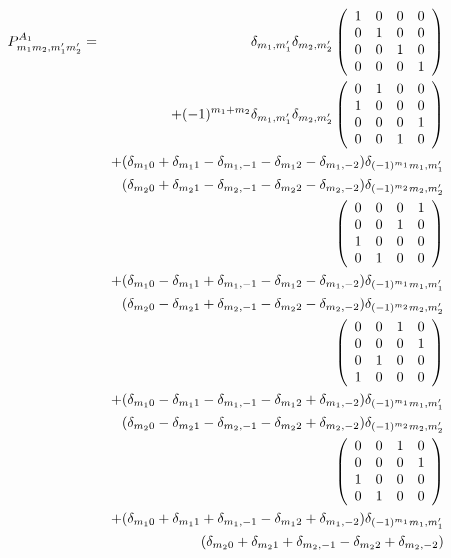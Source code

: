 \begin{eqnarray}\label{P}
P^{A_1}_{m_1m_2,m'_1m'_2}&=&\delta_{m_1,m'_1}\delta_{m_2,m'_2}
\left (
\begin{array}{cccc}
1 & 0 & 0 & 0 \\
0 & 1 & 0 & 0 \\
0 & 0 & 1 & 0 \\
0 & 0 & 0 & 1 
\end{array} \right )\nn
&&+(-1)^{m_1+m_2}\delta_{m_1,m'_1}\delta_{m_2,m'_2}
\left (
\begin{array}{cccc}
0 & 1 & 0 & 0 \\
1 & 0 & 0 & 0 \\
0 & 0 & 0 & 1 \\
0 & 0 & 1 & 0 
\end{array} \right )\nn
&&+(\delta_{m_10}+\delta_{m_11}-\delta_{m_1,-1}-\delta_{m_12}-\delta_{m_1,-2})
\delta_{(-1)^{m_1}m_1,m'_1} \nn
&&
(\delta_{m_20}+\delta_{m_21}-\delta_{m_2,-1}-\delta_{m_22}-\delta_{m_2,-2})
\delta_{(-1)^{m_2}m_2,m'_2} \nn
&&\left (
\begin{array}{cccc}
0 & 0 & 0 & 1 \\
0 & 0 & 1 & 0 \\
1 & 0 & 0 & 0 \\
0 & 1 & 0 & 0 
\end{array} \right ) \nn
&&+(\delta_{m_10}-\delta_{m_11}+\delta_{m_1,-1}-\delta_{m_12}-\delta_{m_1,-2})
\delta_{(-1)^{m_1}m_1,m'_1} \nn
&&
(\delta_{m_20}-\delta_{m_21}+\delta_{m_2,-1}-\delta_{m_22}-\delta_{m_2,-2})
\delta_{(-1)^{m_2}m_2,m'_2} \nn
&&\left (
\begin{array}{cccc}
0 & 0 & 1 & 0 \\
0 & 0 & 0 & 1 \\
0 & 1 & 0 & 0 \\
1 & 0 & 0 & 0 
\end{array} \right )\nn
&&+(\delta_{m_10}-\delta_{m_11}-\delta_{m_1,-1}-\delta_{m_12}+\delta_{m_1,-2})
\delta_{(-1)^{m_1}m_1,m'_1}\nn
&&(\delta_{m_20}-\delta_{m_21}-\delta_{m_2,-1}-\delta_{m_22}+\delta_{m_2,-2})
\delta_{(-1)^{m_2}m_2,m'_2}\nn
&&\left (
\begin{array}{cccc}
0 & 0 & 1 & 0 \\
0 & 0 & 0 & 1 \\
1 & 0 & 0 & 0 \\
0 & 1 & 0 & 0 
\end{array} \right )\nn
&&+(\delta_{m_10}+\delta_{m_11}+\delta_{m_1,-1}-\delta_{m_12}+\delta_{m_1,-2})
\delta_{(-1)^{m_1}m_1,m'_1}\nn
&&(\delta_{m_20}+\delta_{m_21}+\delta_{m_2,-1}-\delta_{m_22}+\delta_{m_2,-2})

\end{eqnarray}
